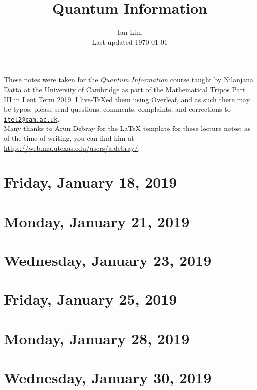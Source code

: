 \documentclass[reqno]{amsart}
\begin{document}
\title{Quantum Information}
\author{Ian Lim\\ Last updated \today}
\maketitle
{\small\noindent These notes were taken for the \textit{Quantum Information} course taught by Nilanjana Datta at the University of Cambridge as part of the Mathematical Tripos Part III in Lent Term 2019. I live-\TeX ed them using Overleaf, and as such there may be typos; please send questions, comments, complaints, and corrections to 
\href{mailto:itel2@cam.ac.uk?subject=QI\%20Lecture\%20Notes}{\texttt{itel2@cam.ac.uk}}.\\
Many thanks to Arun Debray for the {\LaTeX} template for these lecture notes: as of the time of writing, you can find him at \url{https://web.ma.utexas.edu/users/a.debray/}.}

\tableofcontents

\section{Friday, January 18, 2019}
	

\section{Monday, January 21, 2019}  
    

\section{Wednesday, January 23, 2019}
    

\section{Friday, January 25, 2019}
    
    
\section{Monday, January 28, 2019}
    

\section{Wednesday, January 30, 2019}
    
\end{document}
